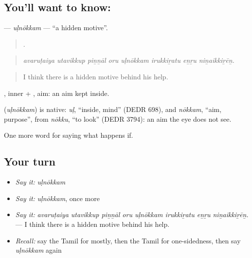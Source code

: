 \subsection*{You'll want to know: }
\textbf{} — \emph{uḷnōkkam} — \textquotedblleft{}a hidden motive\textquotedblright{}.

\begin{quote}
       .
\end{quote}

\begin{quote}
\emph{avaruṭaiya utavikkup piṉṉāl oru uḷnōkkam irukkiṟatu eṉṟu niṉaikkiṟēṉ.}
\end{quote}

\begin{quote}
I think there is a hidden motive behind his help.
\end{quote}

, inner + , aim: an aim kept inside.

\begin{cousinweb}
\textbf{} (\emph{uḷnōkkam}) is native: \emph{uḷ}, \textquotedblleft{}inside, mind\textquotedblright{} (DEDR 698), and \emph{nōkkam}, \textquotedblleft{}aim, purpose\textquotedblright{}, from \emph{nōkku}, \textquotedblleft{}to look\textquotedblright{} (DEDR 3794): an aim the eye does not see.
\end{cousinweb}

\begin{grammarlens}[title={What you've built}]
One more word for saying what happens if.
\end{grammarlens}

\subsection*{Your turn}
\begin{itemize}
\raggedright
  \item \emph{Say it:} \emph{uḷnōkkam}
  \item \emph{Say it:} \emph{uḷnōkkam}, once more
  \item \emph{Say it:} \emph{avaruṭaiya utavikkup piṉṉāl oru uḷnōkkam irukkiṟatu eṉṟu niṉaikkiṟēṉ.} — I think there is a hidden motive behind his help.
  \item \emph{Recall:} say the Tamil for mostly, then the Tamil for one-sidedness, then say \emph{uḷnōkkam} again
\end{itemize}

